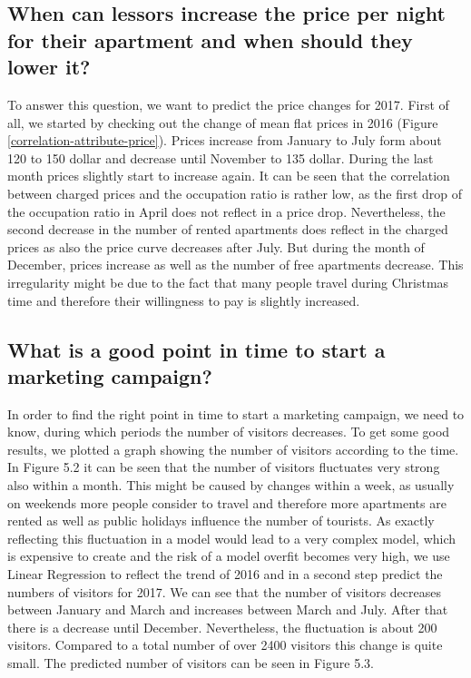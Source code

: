 \subsection{When can lessors increase the price per night for their apartment and when should they lower it?}
To answer this question, we want to predict the price changes for 2017. First of all, we started by checking out the change of mean flat prices in 2016 (Figure \ref{correlation-attribute-price}). 
Prices increase from January to July form about 120 to 150 dollar and decrease until November to 135 dollar. During the last month prices slightly start to increase again. It can be seen that the correlation between charged prices and the occupation ratio is rather low, as the first drop of the occupation ratio in April does not reflect in a price drop. Nevertheless, the second decrease in the number of rented apartments does reflect in the charged prices as also the price curve decreases after July. But during the month of December, prices increase as well as the number of free apartments decrease. This irregularity might be due to the fact that many people travel during Christmas time and therefore their willingness to pay is slightly increased. 

\subsection{What is a good point in time to start a marketing campaign?}
In order to find the right point in time to start a marketing campaign, we need to know, during which periods the number of visitors decreases. To get some good results, we plotted a graph showing the number of visitors according to the time.
In Figure 5.2 it can be seen that the number of visitors fluctuates very strong also within a month. This might be caused by changes within a week, as usually on weekends more people consider to travel and therefore more apartments are rented as well as public holidays influence the number of tourists. As exactly reflecting this fluctuation in a model would lead to a very complex model, which is expensive to create and the risk of a model overfit becomes very high, we use Linear Regression to reflect the trend of 2016 and in a second step predict the numbers of visitors for 2017. We can see that the number of visitors decreases between January and March and increases between March and July. After that there is a decrease until December. Nevertheless, the fluctuation is about 200 visitors. Compared to a total number of over 2400 visitors this change is quite small.
The predicted number of visitors can be seen in Figure 5.3.

